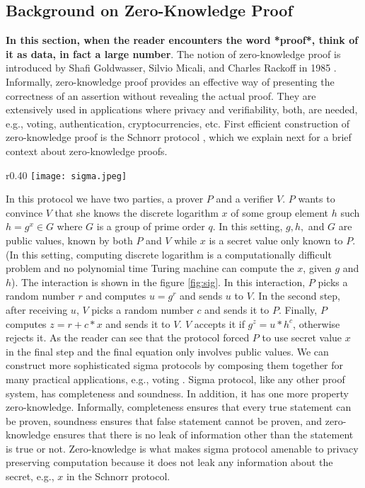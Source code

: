 \documentclass[12pt,a4paper]{article}
\begin{document}
\subsection*{Background on Zero-Knowledge Proof}
\textbf{In this section, when the reader encounters the word *proof*, think of it as data, in fact a large number}.
The notion of zero-knowledge proof is introduced by Shafi Goldwasser, Silvio Micali,
and Charles Rackoff in 1985 \cite{10.1145/22145.22178}. Informally, zero-knowledge proof 
provides an effective way of presenting the correctness of an assertion without revealing the actual proof.
They are extensively used in applications where privacy and 
verifiability, both, are needed, e.g., voting, authentication, cryptocurrencies, etc. 
First efficient construction of zero-knowledge proof is the Schnorr protocol \cite{schnorr1991efficient}, 
which we explain next for a brief context about zero-knowledge proofs. 

\begin{wrapfigure}{r}{0.40\textwidth} %
  \centering
\texttt{[image: sigma.jpeg]}
\caption{Sigma Protocol}
\label{fig:sig}
\end{wrapfigure}

In this protocol we have two parties, a prover $P$ and a verifier $V$. $P$ wants to convince 
$V$ that she knows the discrete logarithm $x$ of some group element $h$ such $h = g^x \in G$
where $G$ is a group of prime order $q$. In this setting, $g, h,$ and $G$ are public values, known 
by both $P$ and $V$ while $x$ is a secret value only known to $P$. (In this setting, computing 
discrete logarithm is a computationally difficult problem and no polynomial time 
Turing machine can compute the $x$, given $g$ and $h$).
The interaction 
is shown in the figure \ref{fig:sig}. In this interaction, $P$ picks a random number 
$r$ and computes $u = g^r$ and sends $u$ to $V$. In the second step, after receiving $u$, $V$ picks 
a random number $c$ and sends it to $P$.  Finally, $P$ computes $z = r + c * x$ and sends it 
to $V$. $V$ accepts it if $g^z = u * h^c$, otherwise rejects it. As the reader can 
see that the protocol 
forced $P$ to use secret value $x$ in the final step and the 
final equation only involves public values. We can construct 
more sophisticated sigma protocols by composing them together \cite{cramer1996modular}
for many practical applications, e.g., voting \cite{adida2008helios, cortier2019belenios}.
Sigma protocol, like any other proof system, has 
completeness and soundness. In addition, it has one more property 
zero-knowledge. Informally, completeness ensures 
that every true statement can be proven, soundness ensures that 
false statement cannot be proven, and zero-knowledge ensures that 
there is no leak of information other than the statement is true or not.
Zero-knowledge is what makes sigma protocol amenable to privacy preserving computation 
because it does not leak any information about the secret, e.g., $x$ 
in the Schnorr protocol. 
\end{document}
